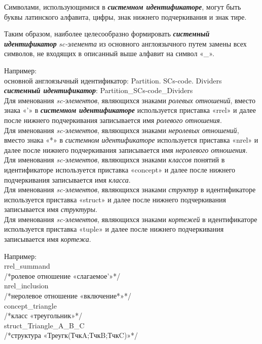 \begin{SCn}
{Символами, использующимися в \textbf{\textit{системном идентификаторе}}, могут быть буквы латинского алфавита, цифры, знак нижнего подчеркивания и знак тире. 

Таким образом, наиболее целесообразно формировать \textbf{\textit{системный идентификатор}} \textit{sc-элемента} из основного англоязычного путем замены всех символов, не входящих в описанный выше алфавит на символ «\_».

Например:\\
основной англоязычный идентификатор: Partition. SCs-code. Dividers\\
\textbf{\textit{системный идентификатор}}: Partition\_SCs-code\_Dividers\\
Для именования \textit{sc-элементов}, являющихся знаками \textit{ролевых отношений}, вместо знака «’» в \textbf{\textit{системном идентификаторе}} используется приставка «rrel» и далее после нижнего подчеркивания записывается имя \textit{ролевого отношения}.\\
Для именования \textit{sc-элементов}, являющихся знаками \textit{неролевых отношений}, вместо знака «*» в \textit{системном идентификаторе} используется приставка «nrel» и далее после нижнего подчеркивания записывается имя \textit{неролевого отношения}.\\
Для именования \textit{sc-элементов}, являющихся знаками \textit{классов} понятий в идентификаторе используется приставка «concept» и далее после нижнего подчеркивания записывается имя \textit{класса}.\\
Для именования \textit{sc-элементов}, являющихся знаками \textit{структур} в идентификаторе используется приставка «struct» и далее после нижнего подчеркивания записывается имя \textit{структуры}.\\
Для именования \textit{sc-элементов}, являющихся знаками \textit{кортежей} в идентификаторе используется приставка «tuple» и далее после нижнего подчеркивания записывается имя \textit{кортежа}.

Например:\\
rrel\_summand\\
/*ролевое отношение «слагаемое’»*/\\
nrel\_inclusion\\
/*неролевое отношение «включение*»*/\\
concept\_triangle\\
/*класс «треугольник»*/\\
struct\_Triangle\_A\_B\_C\\
/*структура «Треугк(ТчкA;ТчкB;ТчкC)»*/
}


\scnendstruct

\end{SCn}